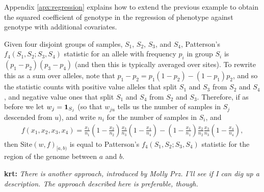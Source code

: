 \documentclass{article}
\newcommand{\site}{\mbox{Site}} %
\newcommand{\iw}{w} %
\newcommand{\krt}[1]{{\color{green}\textbf{krt:} \it #1}}
\begin{document}
Appendix \ref{apx:regression} explains how to extend the previous example
to obtain the squared coefficient of genotype in the regression of phenotype
against genotype with additional covariates.

\begin{example}[Patterson's $f_4$] \label{ex:site_f4}
    Given four disjoint groups of samples, $S_1$, $S_2$, $S_3$, and $S_4$,
    Patterson's $f_4(S_1, S_2; S_3, S_4)$ statistic for an allele with frequency $p_i$ in group $S_i$
    is $(p_1 - p_2)(p_3 - p_4)$ (and then this is typically averaged over sites).
    To rewrite this as a sum over alleles, note that
    $p_1 - p_2 = p_1 (1 - p_2) - (1 - p_1) p_2$,
    and so the statistic counts with positive value
    alleles that split $S_1$ and $S_3$ from $S_2$ and $S_4$,
    and negative value ones that split $S_1$ and $S_4$ from $S_2$ and $S_3$.
    Therefore, if as before we
    let $\iw_j = \bone_{S_j}$
    (so that $\iw_{ju}$ tells us the number of samples in $S_j$ descended from $u$),
    and write $n_i$ for the number of samples in $S_i$, and
    \begin{align*}
        f(x_1, x_2, x_3, x_4)
        =
        \frac{x_1}{n_1}
        \left(1 - \frac{x_2}{n_2}\right)
        \frac{x_3}{n_3}
        \left(1 - \frac{x_4}{n_4}\right)
        -
        \left(1 - \frac{x_1}{n_1}\right)
        \frac{x_2}{n_2}
        \frac{x_3}{n_3}
        \left(1 - \frac{x_4}{n_4}\right),
    \end{align*}
    then $\site(\iw, f)_{[a,b)}$ is equal to Patterson's $f_4(S_1, S_2; S_3, S_4)$ statistic
    for the region of the genome between $a$ and $b$.
\end{example}

\krt{There is another approach, introduced by Molly Prz.  I'll see if I can dig up a description.  The approach
described here is preferable, though.}
\end{document}
